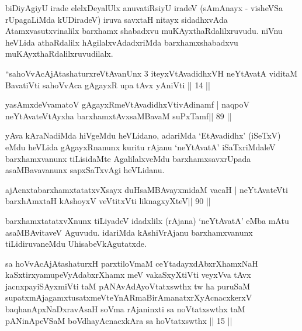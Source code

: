 \begin{artha}
biDiyAgiyU irade elelxDeyalUlx anuvatiRsiyU iradeV (sAmAnayx - visheVSa rUpagaLiMda kUDiradeV) iruva savxtaH nitayx sidadhxvAda Atamxvasutxvinalilx barxhamx shabadxvu muKAyxthaRdalilxruvudu. niVnu heVLida athaRdalilx hAgilalxvAdadxriMda barxhamxshabadxvu muKAyxthaRdalilxruvudilalx.
\end{artha} 

\newpage


\begin{kandikeshl}
``sahoVvAcAjAtashaturxreVtAvanUnx 3 iteyxVtAvadidhxVH
neYtAvatA viditaM BavatiVti sahoVvAca gAgayxR
upa tAvx yAniVti || 14 ||
\end{kandikeshl}

\begin{shl}
yasAmxdeVvamatoV gAgayxRmeVtAvadidhxVtivAdinamf |
naqpoV neYtAvateVtAyxha barxhamxtAvxsaMBavaM suPxTamf\hfill || 89 ||
\end{shl}

\begin{artha}
yAva kAraNadiMda hiVgeMdu heVLidano, adariMda `EtAvadidhx' (iSeTxV) eMdu heVLida gAgayxRnanunx kuritu rAjanu `neYtAvatA' iSaTxriMdaleV barxhamxvanunx tiLisidaMte AgalilalxveMdu barxhamxsavxrUpada asaMBavavanunx sapxSaTxvAgi heVLidanu.
\end{artha}


\begin{shl}
ajAcnxtabarxhamxtatatxvXsayx duHsaMBAvayxmidaM vacaH |
neYtAvateVti barxhAmxtaH kAshoyxV veVtitxVti liknagxyXteV\hfill || 90 ||
\end{shl}

\begin{artha}
barxhamxtatatxvXnunx tiLiyadeV idadxlilx (rAjana) `neYtAvatA' eMba mAtu  asaMBAvitaveV Aguvudu. idariMda kAshiVrAjanu barxhamxvanunx tiLidiruvaneMdu UhisabeVkAgutatxde.
\end{artha}


\begin{kandikeshl}
sa hoVvAcAjAtashaturxH parxtiloVmaM ceYtadayxdAbxrXhamxNaH kaSxtirxyamupeVyAdabxrXhamx meV vakaSxyXtiVti veyxVva tAvx jacnxpayiSAyxmiVti taM pANAvAdAyoVtatxswthx tw ha puruSaM supatxmAjagamxtusatxmeVteYnARmaBirAmanatxrXyAcnacxkerxV baqhanApxNaDxravAsaH soVma rAjaninxti sa noVtatxswthx taM pANinApeVSaM boVdhayAcnacxkAra sa hoVtatxswthx || 15 ||
\end{kandikeshl}

